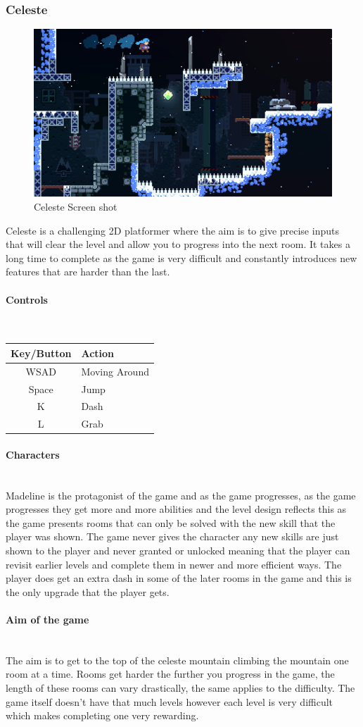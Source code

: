 \documentclass{article}
\newcommand{\myparagraph}[1]{\paragraph{#1}\mbox{}\\} %
\newcommand{\smallBr}{\vspace{1.5mm}}
\begin{document}
\subsubsection{Celeste}
\begin{figure}[h]
\includegraphics[width=\linewidth]{Celeste ss}
\caption{\cite{Celss} Celeste Screen shot}
\end{figure}
Celeste is a challenging 2D platformer where the aim is to give precise inputs that will clear the level and allow you to progress into the next room. It takes a long time to complete as the game is very difficult and constantly introduces new features that are harder than the last.

\myparagraph{Controls}
\smallBr
\begin{tabular}{c|l}
Key/Button & Action        \\ \hline
WSAD       & Moving Around \\
Space      & Jump          \\
K          & Dash          \\
L          & Grab         
\end{tabular}

\myparagraph{Characters}
Madeline is the protagonist of the game and as the game progresses, as the game progresses they get more and more abilities and the level design reflects this as the game presents rooms that can only be solved with the new skill that the player was shown. The game never gives the character any new skills are just shown to the player and never granted or unlocked meaning that the player can revisit earlier levels and complete them in newer and more efficient ways. The player does get an extra dash in some of the later rooms in the game and this is the only upgrade that the player gets.

\myparagraph{Aim of the game}
The aim is to get to the top of the celeste mountain climbing the mountain one room at a time. Rooms get harder the further you progress in the game, the length of these rooms can vary drastically, the same applies to the difficulty. The game itself doesn't have that much levels however each level is very difficult which makes completing one very rewarding.
\end{document}
